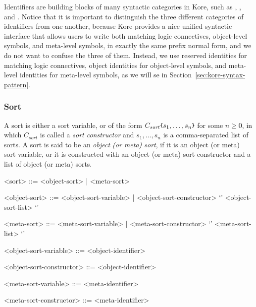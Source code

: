 \documentclass[UTF8,11pt]{article}
\theoremstyle{plain}
\theoremstyle{definition}
\theoremstyle{remark}
\newcommand{\parametric}[2]{{#1}\raisebox{.2ex}{\texttt{\footnotesize{\{}}}#2\raisebox{.2ex}{\texttt{\footnotesize{\}}}}}
\newcommand{\itsort}{\mathit{sort}}
\newcommand{\syntacc}[1]{\text{$\langle$\textit{#1}$\rangle$}}
\begin{document}
Identifiers are building blocks of many syntactic categories in Kore, such as 
\syntacc{sort}, \syntacc{symbol}, and \syntacc{pattern}.
Notice that it is important to distinguish the three different categories of 
identifiers from one another,
because Kore provides a nice unified syntactic interface that allows users to 
write both matching logic connectives, object-level symbols, and meta-level 
symbols, in 
exactly the same prefix normal form,
and we do not want to confuse the three of them.
Instead, we use reserved identities for matching logic connectives, object 
identities for object-level symbols, and meta-level identities for meta-level 
symbols, as we will se in Section~\ref{sec:kore-syntax-pattern}.

\subsubsection{Sort}
A sort is either a sort variable, or of the form 
$\parametric{C_\itsort}{s_1,\dots,s_n}$ for some $n \ge 0$, in which 
$C_\itsort$ is called a \emph{sort constructor} and $s_1,\dots,s_n$ is a 
comma-separated list of sorts.
A sort is said to be an \emph{object (or meta) sort}, if it is an object (or 
meta) sort variable, or it is constructed with an object (or meta) sort 
constructor and a list of object (or meta) sorts.
\begin{grammar}\small
	<sort> ::= <object-sort> | <meta-sort>
	
	<object-sort> ::= <object-sort-variable> | <object-sort-constructor> `{' 
	<object-sort-list> `}'
	
	<meta-sort> ::= <meta-sort-variable> | <meta-sort-constructor> `{' 
	<meta-sort-list> `}'

    <object-sort-variable> ::= <object-identifier>

    <object-sort-constructor> ::= <object-identifier>

    <meta-sort-variable> ::= <meta-identifier>

    <meta-sort-constructor> ::= <meta-identifier>
\end{grammar}
\end{document}

